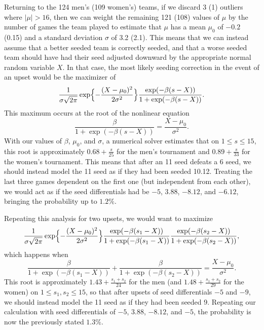 \documentclass{article}
\begin{document}
Returning to the 124 men's (109 women's) teams, if we discard 3 (1) outliers where $\lvert\mu\rvert>16$, then we can weight the remaining 121 (108) values of $\mu$ by the number of games the team played to estimate that $\mu$ has a mean $\mu_0$  of $-0.2$ (0.15) and a standard deviation $\sigma$  of 3.2 (2.1). This means that we can instead assume that a better seeded team is correctly seeded, and that a worse seeded team should have had their seed adjusted downward by the appropriate normal random variable $X$.  In that case, the most likely seeding correction in the event of an upset would be the maximizer of
\[\frac1{\sigma\sqrt{2\pi}}\exp\Bigl\{-\frac{(X-\mu_0)^2}{2\sigma^2}\Bigr\}\frac{\exp(-\beta(s-X))}{1+\exp(-\beta(s-X))}.\]
This maximum occurs at the root of the nonlinear equation
\[\frac\beta{1+\exp(-\beta(s-X))}=\frac{X-\mu_0}{\sigma^2}.\]
With our values of $\beta$, $\mu_0$, and $\sigma$, a numerical solver estimates that on $1\le s\le15$, this root is approximately $0.68+\frac s{25}$ for the men's tournament and $0.89+\frac s{33}$ for the women's tournament.  This means that after an 11 seed defeats a 6 seed, we should instead model the 11 seed as if they had been seeded 10.12.  Treating the last three games dependent on the first one (but independent from each other), we would act as if the seed differentials had be $-5$, $3.88$, $-8.12$, and $-6.12$, bringing the probability up to $1.2\%$.

Repeating this analysis for two upsets, we would want to maximize
\[
\frac1{\sigma\sqrt{2\pi}}\exp\Bigl\{-\frac{(X-\mu_0)^2}{2\sigma^2}\Bigr\}
\frac{\exp(-\beta(s_1-X))}{1+\exp(-\beta(s_1-X))}
\frac{\exp(-\beta(s_2-X))}{1+\exp(-\beta(s_2-X))},
\]
which happens when
\[\frac\beta{1+\exp(-\beta(s_1-X))}+\frac\beta{1+\exp(-\beta(s_2-X))}=\frac{X-\mu_0}{\sigma^2}.\]
This root is approximately $1.43+\frac{s_1+s_2}{24}$ for the men (and $1.48+\frac{s_1+s_2}{29}$ for the women) on $1\le s_1,s_2\le15$, so that after upsets of seed differentials $-5$ and $-9$, we should instead model the 11 seed as if they had been seeded 9.  Repeating our calculation with seed differentials of $-5$, $3.88$, $-8.12$, and $-5$, the probability is now the previously stated $1.3\%$.
\end{document}
